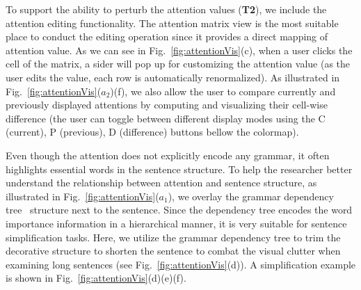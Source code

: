To support the ability to perturb the attention values (\textbf{T2}), we include the attention editing functionality. The attention matrix view is the most suitable place to conduct the editing operation since it provides a direct mapping of attention value.
As we can see in Fig.~\ref{fig:attentionVis}(c), when a user clicks the cell of the matrix, a sider will pop up for customizing the attention value (as the user edits the value, each row is automatically renormalized).
%
As illustrated in Fig.~\ref{fig:attentionVis}($a_{2}$)(f), we also allow the user to compare currently and previously displayed attentions by computing and visualizing their cell-wise difference (the user can toggle between different display modes using the C (current), P (previous), D (difference) buttons bellow the colormap).


Even though the attention does not explicitly encode any grammar, it often highlights essential words in the sentence structure.
%
To help the researcher better understand the relationship between attention and sentence structure, as illustrated in Fig.~\ref{fig:attentionVis}($a_{1}$), we overlay the grammar dependency tree~\cite{Nivre2005} structure next to the sentence.
%
Since the dependency tree encodes the word importance information in a hierarchical manner, it is very suitable for sentence simplification tasks.
Here, we utilize the grammar dependency tree to trim the decorative structure to shorten the sentence to combat the visual clutter when examining long sentences (see Fig.~\ref{fig:attentionVis}(d)). A simplification example is shown in  Fig.~\ref{fig:attentionVis}(d)(e)(f).




